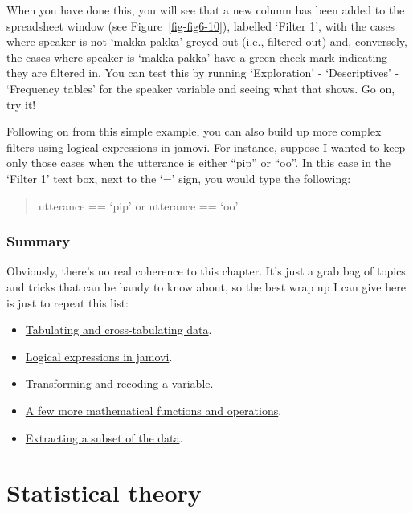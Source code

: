 \documentclass[
  a4paper,
]{book}
\providecommand{\tightlist}{%
  \setlength{\itemsep}{0pt}\setlength{\parskip}{0pt}}\usepackage{longtable,booktabs,array}
\begin{document}
When you have done this, you will see that a new column has been added
to the spreadsheet window (see Figure~\ref{fig-fig6-10}), labelled
`Filter 1', with the cases where speaker is not `makka-pakka' greyed-out
(i.e., filtered out) and, conversely, the cases where speaker is
`makka-pakka' have a green check mark indicating they are filtered in.
You can test this by running `Exploration' - `Descriptives' - `Frequency
tables' for the speaker variable and seeing what that shows. Go on, try
it!

Following on from this simple example, you can also build up more
complex filters using logical expressions in jamovi. For instance,
suppose I wanted to keep only those cases when the utterance is either
``pip'' or ``oo''. In this case in the `Filter 1' text box, next to the
`=' sign, you would type the following:

\begin{quote}
utterance == `pip' or utterance == `oo'
\end{quote}

\hypertarget{summary-4}{%
\section{Summary}\label{summary-4}}

Obviously, there's no real coherence to this chapter. It's just a grab
bag of topics and tricks that can be handy to know about, so the best
wrap up I can give here is just to repeat this list:

\begin{itemize}
\tightlist
\item
  \protect\hyperlink{sec-Tabulating-and-cross-tabulating-data}{Tabulating
  and cross-tabulating data}.
\item
  \protect\hyperlink{logical-expressions-in-jamovi}{Logical expressions
  in jamovi}.
\item
  \protect\hyperlink{sec-Transforming-and-recoding-a-variable}{Transforming
  and recoding a variable}.
\item
  \protect\hyperlink{a-few-more-mathematical-functions-and-operations}{A
  few more mathematical functions and operations}.
\item
  \protect\hyperlink{extracting-a-subset-of-the-data}{Extracting a
  subset of the data}.
\end{itemize}

\part{Statistical theory}
\end{document}
